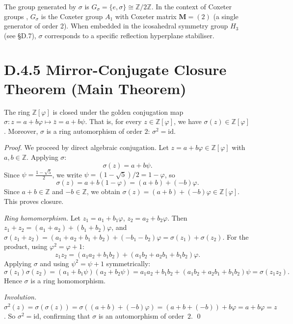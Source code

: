 The group generated by $\sigma$ is $G_\sigma = \{e, \sigma\} \cong \mathbb{Z}/2\mathbb{Z}$.
In the context of Coxeter groups \cite{coxeter_regular_polytopes}, $G_\sigma$ is
the Coxeter group $A_1$ with Coxeter matrix $\mathbf{M} = (2)$ (a single generator
of order 2).  When embedded in the icosahedral symmetry group $H_3$ (see \S D.7),
$\sigma$ corresponds to a specific reflection hyperplane stabiliser.

\section*{D.4.5  Mirror-Conjugate Closure Theorem (Main Theorem)}

\begin{theorem}
\label{thm:D:2}
The ring $\mathbb{Z}[\varphi]$ is closed under the golden conjugation map
$\sigma: z = a + b\varphi \mapsto \bar{z} = a + b\psi$.
That is, for every $z \in \mathbb{Z}[\varphi]$, we have
$\sigma(z) \in \mathbb{Z}[\varphi]$.
Moreover, $\sigma$ is a ring automorphism of order $2$: $\sigma^2 = \mathrm{id}$.
\end{theorem}

\begin{proof}
We proceed by direct algebraic conjugation.
Let $z = a + b\varphi \in \mathbb{Z}[\varphi]$ with $a, b \in \mathbb{Z}$.
Applying $\sigma$:
\[
  \sigma(z) = a + b\psi.
\]
Since $\psi = \frac{1-\sqrt{5}}{2}$, we write
$\psi = (1 - \sqrt{5})/2 = 1 - \varphi$, so
\[
  \sigma(z) = a + b(1-\varphi) = (a+b) + (-b)\varphi.
\]
Since $a+b\in\mathbb{Z}$ and $-b\in\mathbb{Z}$, we obtain
$\sigma(z) = (a+b) + (-b)\varphi \in \mathbb{Z}[\varphi]$.
This proves closure.

\medskip\noindent\textit{Ring homomorphism.}
Let $z_1 = a_1 + b_1\varphi$, $z_2 = a_2 + b_2\varphi$.
Then $z_1 + z_2 = (a_1+a_2) + (b_1+b_2)\varphi$, and
$\sigma(z_1+z_2) = (a_1+a_2+b_1+b_2) + (-b_1-b_2)\varphi
= \sigma(z_1)+\sigma(z_2)$.
For the product, using $\varphi^2 = \varphi+1$:
\[
  z_1 z_2 = (a_1 a_2 + b_1 b_2) + (a_1 b_2 + a_2 b_1 + b_1 b_2)\varphi.
\]
Applying $\sigma$ and using $\psi^2 = \psi+1$ symmetrically:
\[
  \sigma(z_1)\sigma(z_2)
  = (a_1+b_1\psi)(a_2+b_2\psi)
  = a_1 a_2 + b_1 b_2
  + (a_1 b_2 + a_2 b_1 + b_1 b_2)\psi
  = \sigma(z_1 z_2).
\]
Hence $\sigma$ is a ring homomorphism.

\medskip\noindent\textit{Involution.}
$\sigma^2(z) = \sigma(\sigma(z)) = \sigma((a+b)+(-b)\varphi)
= (a+b+(-b))+b\varphi = a+b\varphi = z$.
So $\sigma^2 = \mathrm{id}$, confirming that $\sigma$ is an automorphism of
order~$2$. \qed
\end{proof}

